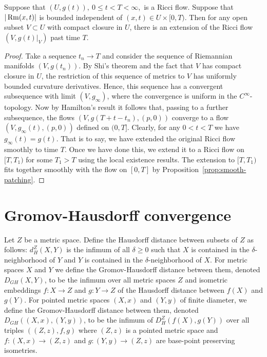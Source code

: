 \begin{corollary}\label{cor:ricci-flow-extension-bounded-curvature}


Suppose that $(U,g(t)),\ 0\le t<T<\infty$,\ is a Ricci flow. Suppose
that $|\operatorname{Rm}(x,t)|$ is bounded independent of $(x,t)\in U\times
[0,T)$. Then for any open subset $V\subset U$ with compact closure
in $U$, there is an extension of the Ricci flow $(V,g(t)|_V)$ past
time $T$.
\end{corollary}

\begin{proof}
\sketch
{}
 Take a sequence $t_n\rightarrow T$ and consider the
sequence of Riemannian manifolds $(V,g(t_n))$. By Shi's theorem and the fact
that $V$ has compact closure in $U$, the restriction of this sequence of
metrics to $V$ has uniformly bounded curvature derivatives. Hence, this
sequence has a convergent subsequence with limit $(V,g_\infty)$, where the
convergence is uniform in the $C^\infty$-topology. Now by Hamilton's result
\cite{Hamiltonlimits} it follows that, passing to a further subsequence, the
flows $(V,g(T+t-t_n),(p,0))$ converge to a flow $(V,g_\infty(t),(p,0))$ defined
on $(0,T]$. Clearly, for any $0<t<T$ we have $g_\infty(t)=g(t)$. That is to
say, we have extended the original Ricci flow smoothly to time $T$. Once we
have done this, we extend it to a Ricci flow on $[T,T_1)$ for some $T_1> T$
using the local existence results. The extension to $[T,T_1)$ fits together
smoothly with the flow on $[0,T]$ by Proposition~\ref{prop:smooth-patching}.
\end{proof}




\section{Gromov-Hausdorff convergence}

Let $Z$ be a metric space. Define the
Hausdorff distance between subsets of $Z$ as follows: $d^Z_H(X,Y)$ is the
infimum of all $\delta\ge 0$ such that $X$ is contained in the
$\delta$-neighborhood of $Y$ and $Y$ is contained in the $\delta$-neighborhood
of $X$. For metric spaces $X$ and $Y$ we define the Gromov-Hausdorff distance
between them, denoted $D_{GH}(X,Y)$, to be the infimum over all metric spaces
$Z$ and isometric embeddings $f\colon X\to Z$ and $g\colon Y\to Z$ of the
Hausdorff distance between $f(X)$ and $g(Y)$. For pointed metric spaces $(X,x)$
and $(Y,y)$ of finite diameter, we define the Gromov-Hausdorff
distance between them, denoted
$D_{GH}((X,x),(Y,y))$, to be the infimum of $D_H^Z(f(X),g(Y))$ over all triples
$((Z,z),f,g)$ where $(Z,z)$ is a pointed metric space and $f\colon (X,x)\to
(Z,z)$ and $g\colon (Y,y)\to (Z,z)$ are base-point preserving isometries.


